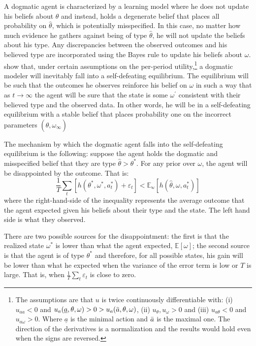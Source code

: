 \documentclass[
  12pt,
]{article}
\begin{document}
A dogmatic agent is characterized by a learning model where he does not
update his beliefs about \(\theta\) and instead, holds a degenerate
belief that places all probability on \(\hat{\theta}\), which is
potentially misspecified. In this case, no matter how much evidence he
gathers against being of type \(\hat{\theta}\), he will not update the
beliefs about his type. Any discrepancies between the observed outcomes
and his believed type are incorporated using the Bayes rule to update
his beliefs about \(\omega\). \citet{Heidhues2018} show that, under
certain assumptions on the per-period
utility,\footnote{The assumptions are that $u$ is twice continuously differentiable with: (i)$u_{aa}<0$ and $u_a(\underline{a},  \theta, \omega)>0>u_a(\Bar{a}, \theta, \omega)$, (ii) $u_{\theta}, u_{\omega}>0$ and (iii) $u_{a\theta}<0$ and $u_{a\omega}>0$. Where $\underline{a}$ is the
minimal action and $\Bar{a}$ is the maximal one. The direction of the derivatives is a normalization
and the results would hold even when the signs are reversed.} a dogmatic
modeler will inevitably fall into a self-defeating equilibrium. The
equilibrium will be such that the outcomes he observes reinforce his
belief on \(\omega\) in such a way that as \(t\to\infty\) the agent will
be sure that the state is some \(\omega^{'}\) consistent with their
believed type and the observed data. In other words, he will be in a
self-defeating equilibrium with a stable belief that places probability
one on the incorrect parameters \((\hat{\theta}, \omega_{\infty})\)

The mechanism by which the dogmatic agent falls into the self-defeating
equilibrium is the following: suppose the agent holds the dogmatic and
misspecified belief that they are type \(\hat{\theta}>\theta^*\). For
any prior over \(\omega\), the agent will be disappointed by the
outcome. That is:
\[\frac{1}{T}\sum_t \left[{h}(\theta^*, \omega^*, a_t^*)+\varepsilon_t\right] <\mathbb{E_w} \left[h(\hat{\theta}, \omega, a_t^*)\right]\]
where the right-hand-side of the inequality represents the average
outcome that the agent expected given his beliefs about their type and
the state. The left hand side is what they observed.

There are two possible sources for the disappointment: the first is that
the realized state \(\omega^*\) is lower than what the agent expected,
\(\mathbb{E}[\omega]\); the second source is that the agent is of type
\(\theta^*\) and therefore, for all possible states, his gain will be
lower than what he expected when the variance of the error term is low
or \(T\) is large. That is, when \(\frac{1}{T}\sum_t\varepsilon_t\) is
close to zero.
\end{document}
